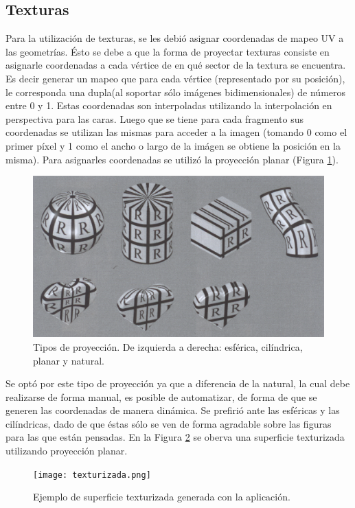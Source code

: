 \documentclass[12pt]{article}
\begin{document}
\subsection{Texturas}
\noindent Para la utilización de texturas, se les debió asignar coordenadas de mapeo UV a las geometrías. Ésto se debe a que la forma de proyectar texturas consiste en asignarle coordenadas a cada vértice de en qué sector de la textura se encuentra. Es decir generar un mapeo que para cada vértice (representado por su posición), le corresponda una dupla(al soportar sólo imágenes bidimensionales) de números entre 0 y 1.  Estas coordenadas son interpoladas utilizando la interpolación en perspectiva para las caras\cite{realtimerendering}\cite{engine}. Luego que se tiene para cada fragmento sus coordenadas se utilizan las mismas para acceder a la imagen (tomando 0 como el primer píxel y 1 como el ancho o largo de la imágen se obtiene la posición en la misma). Para asignarles coordenadas se utilizó la proyección planar\cite{realtimerendering} (Figura \ref{texturas}).
\begin{figure}[h!]
\includegraphics[width =0.7\linewidth, center]{proyecciones.png}
\caption{Tipos de proyección. De izquierda a derecha: esférica, cilíndrica, planar y natural.}
\label{texturas}
\end{figure}

Se optó por este tipo de proyección ya que a diferencia de la natural, la cual debe realizarse de forma manual, es posible de automatizar, de forma de que se generen las coordenadas de manera dinámica. Se prefirió ante las esféricas y las cilíndricas, dado de que éstas sólo se ven de forma agradable sobre las figuras para las que están pensadas. En la Figura \ref{sackboy} se oberva una superficie texturizada utilizando proyección planar.

\begin{figure}[h!]
\texttt{[image: texturizada.png]}
\caption{Ejemplo de superficie texturizada generada con la aplicación.}
\label{sackboy}
\end{figure}
\end{document}
